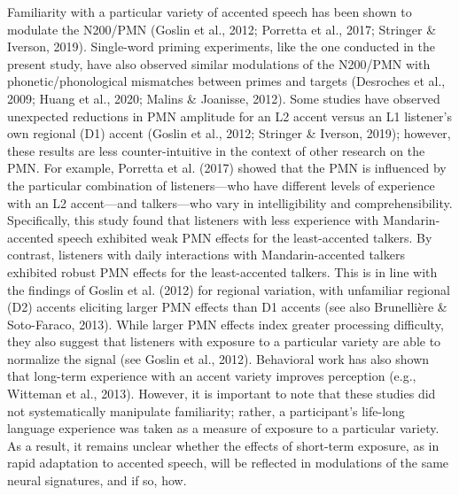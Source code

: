 \documentclass[
  12pt,
  twoside]{article}
\begin{document}
Familiarity with a particular variety of accented speech has been shown to modulate the N200/PMN (Goslin et al., 2012; Porretta et al., 2017; Stringer \& Iverson, 2019).
Single-word priming experiments, like the one conducted in the present study, have also observed similar modulations of the N200/PMN with phonetic/phonological mismatches between primes and targets (Desroches et al., 2009; Huang et al., 2020; Malins \& Joanisse, 2012).
Some studies have observed unexpected reductions in PMN amplitude for an L2 accent versus an L1 listener's own regional (D1) accent (Goslin et al., 2012; Stringer \& Iverson, 2019); however, these results are less counter-intuitive in the context of other research on the PMN.
For example, Porretta et al. (2017) showed that the PMN is influenced by the particular combination of listeners---who have different levels of experience with an L2 accent---and talkers---who vary in intelligibility and comprehensibility.
Specifically, this study found that listeners with less experience with Mandarin-accented speech exhibited weak PMN effects for the least-accented talkers.
By contrast, listeners with daily interactions with Mandarin-accented talkers exhibited robust PMN effects for the least-accented talkers.
This is in line with the findings of Goslin et al. (2012) for regional variation, with unfamiliar regional (D2) accents eliciting larger PMN effects than D1 accents (see also Brunellière \& Soto-Faraco, 2013).
While larger PMN effects index greater processing difficulty, they also suggest that listeners with exposure to a particular variety are able to normalize the signal (see Goslin et al., 2012).
Behavioral work has also shown that long-term experience with an accent variety improves perception (e.g., Witteman et al., 2013).
However, it is important to note that these studies did not systematically manipulate familiarity; rather, a participant's life-long language experience was taken as a measure of exposure to a particular variety.
As a result, it remains unclear whether the effects of short-term exposure, as in rapid adaptation to accented speech, will be reflected in modulations of the same neural signatures, and if so, how.
\end{document}
